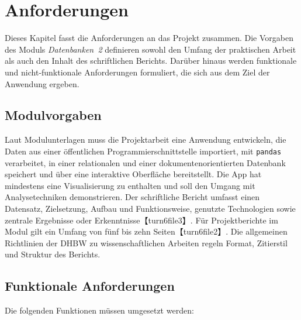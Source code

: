 \section{Anforderungen}
\label{sec:anforderungen}

Dieses Kapitel fasst die Anforderungen an das Projekt zusammen. Die Vorgaben des Moduls \emph{Datenbanken 2} definieren sowohl den Umfang der praktischen Arbeit als auch den Inhalt des schriftlichen Berichts. Darüber hinaus werden funktionale und nicht‑funktionale Anforderungen formuliert, die sich aus dem Ziel der Anwendung ergeben.

\subsection{Modulvorgaben}

Laut Modulunterlagen muss die Projektarbeit eine Anwendung entwickeln, die Daten aus einer öffentlichen Programmierschnittstelle importiert, mit \texttt{pandas} verarbeitet, in einer relationalen und einer dokumentenorientierten Datenbank speichert und über eine interaktive Oberfläche bereitstellt. Die App hat mindestens eine Visualisierung zu enthalten und soll den Umgang mit Analysetechniken demonstrieren. Der schriftliche Bericht umfasst einen Datensatz, Zielsetzung, Aufbau und Funktionsweise, genutzte Technologien sowie zentrale Ergebnisse oder Erkenntnisse【turn6file3】. Für Projektberichte im Modul gilt ein Umfang von fünf bis zehn Seiten【turn6file2】. Die allgemeinen Richtlinien der DHBW zu wissenschaftlichen Arbeiten regeln Format, Zitierstil und Struktur des Berichts\cite{dhbw_guidelines}.

\subsection{Funktionale Anforderungen}

Die folgenden Funktionen müssen umgesetzt werden:

